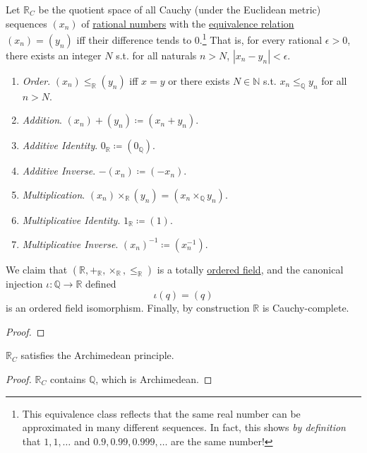   \begin{definition}
    \label{def:reals-as-the-cauchy-completion-of-the-rationals}
    Let $\mathbb{R}_C$ be the quotient space of all Cauchy (under the Euclidean metric) sequences $(x_n)$ of \hyperref[alg-def:rational-numbers]{rational numbers} with the \hyperref[st-def:equivalence_relation]{equivalence relation} $(x_n) = (y_n)$ iff their difference tends to $0$.\footnote{This equivalence class reflects that the same real number can be approximated in many different sequences. In fact, this shows \textit{by definition} that $1, 1, \ldots$ and $0.9, 0.99, 0.999, \ldots$ are the same number!} That is, for every rational $\epsilon > 0$, there exists an integer $N$ s.t. for all naturals $n > N$, $|x_n - y_n| < \epsilon$. 
    \begin{enumerate}
      \item \textit{Order}. $(x_n) \leq_{\mathbb{R}} (y_n)$ iff $x = y$ or there exists $N \in \mathbb{N}$ s.t. $x_n \leq_{\mathbb{Q}} y_n$ for all $n > N$. 
      \item \textit{Addition}. $(x_n) + (y_n) \coloneqq (x_n + y_n)$. 
      \item \textit{Additive Identity}. $0_{\mathbb{R}} \coloneqq (0_{\mathbb{Q}})$. 
      \item \textit{Additive Inverse}. $-(x_n) \coloneqq (-x_n)$. 
      \item \textit{Multiplication}. $(x_n) \times_{\mathbb{R}} (y_n) = (x_n \times_{\mathbb{Q}} y_n)$. 
      \item \textit{Multiplicative Identity}. $1_{\mathbb{R}} \coloneqq (1)$. 
      \item \textit{Multiplicative Inverse}. $(x_n)^{-1} \coloneqq (x_n^{-1})$. 
    \end{enumerate}
    We claim that $(\mathbb{R}, +_{\mathbb{R}}, \times_{\mathbb{R}}, \leq_{\mathbb{R}})$ is a totally \hyperref[alg-def:ordered-field]{ordered field}, and the canonical injection $\iota: \mathbb{Q} \rightarrow \mathbb{R}$ defined 
    \begin{equation}
      \iota(q) = (q)
    \end{equation} 
    is an ordered field isomorphism. Finally, by construction $\mathbb{R}$ is Cauchy-complete. 
  \end{definition}
  \begin{proof}
    
  \end{proof}

  \begin{theorem}
    \label{thm:cauchy-reals-is-archimedean}
    $\mathbb{R}_C$ satisfies the Archimedean principle. 
  \end{theorem}
  \begin{proof}
    $\mathbb{R}_C$ contains $\mathbb{Q}$, which is Archimedean. 
  \end{proof}

